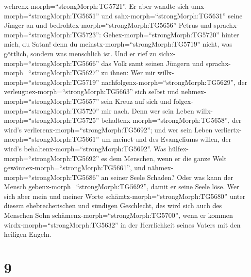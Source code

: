 wehrenx-morph=``strongMorph:TG5721''.  Er aber wandte sich
umx-morph=``strongMorph:TG5651'' und sahx-morph=``strongMorph:TG5631''
seine Jünger an und bedrohtex-morph=``strongMorph:TG5656'' Petrus und
sprachx-morph=``strongMorph:TG5723'': Gehex-morph=``strongMorph:TG5720''
hinter mich, du Satan! denn du meinstx-morph=``strongMorph:TG5719''
nicht, was göttlich, sondern was menschlich ist.  Und er
rief zu sichx-morph=``strongMorph:TG5666'' das Volk samt seinen Jüngern
und sprachx-morph=``strongMorph:TG5627'' zu ihnen: Wer mir
willx-morph=``strongMorph:TG5719''
nachfolgenx-morph=``strongMorph:TG5629'', der
verleugnex-morph=``strongMorph:TG5663'' sich selbst und
nehmex-morph=``strongMorph:TG5657'' sein Kreuz auf sich und
folgex-morph=``strongMorph:TG5720'' mir nach.  Denn wer
sein Leben willx-morph=``strongMorph:TG5725''
behaltenx-morph=``strongMorph:TG5658'', der wird's
verlierenx-morph=``strongMorph:TG5692''; und wer sein Leben
verliertx-morph=``strongMorph:TG5661'' um meinet-und des Evangeliums
willen, der wird's behaltenx-morph=``strongMorph:TG5692''. 
Was hülfex-morph=``strongMorph:TG5692'' es dem Menschen, wenn er die
ganze Welt gewönnex-morph=``strongMorph:TG5661'', und
nähmex-morph=``strongMorph:TG5686'' an seiner Seele Schaden?
 Oder was kann der Mensch
gebenx-morph=``strongMorph:TG5692'', damit er seine Seele löse.
 Wer sich aber mein und meiner Worte
schämtx-morph=``strongMorph:TG5680'' unter diesem ehebrecherischen und
sündigen Geschlecht, des wird sich auch des Menschen Sohn
schämenx-morph=``strongMorph:TG5700'', wenn er kommen
wirdx-morph=``strongMorph:TG5632'' in der Herrlichkeit seines Vaters mit
den heiligen Engeln.

\hypertarget{section-8}{%
\section{9}\label{section-8}}

